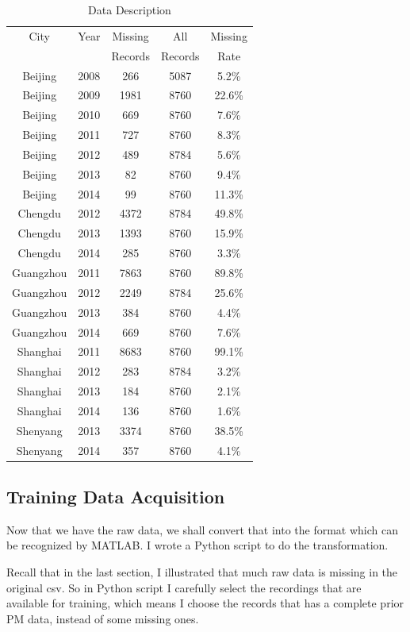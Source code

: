 \documentclass{sig-alternate}
\begin{document}
\begin{table}[ht]
\centering
\caption{Data Description}
\begin{tabular}{|c|c|c|c|c|}  \hline
City&Year&Missing&All&Missing \\
&&Records&Records&Rate\\ \hline
Beijing&2008&266&5087&5.2\% \\ \hline
Beijing&2009&1981&8760&22.6\% \\ \hline
Beijing&2010&669&8760&7.6\% \\ \hline
Beijing&2011&727&8760&8.3\% \\ \hline
Beijing&2012&489&8784&5.6\% \\ \hline
Beijing&2013&82&8760&9.4\% \\ \hline
Beijing&2014&99&8760&11.3\% \\ \hline \hline
Chengdu&2012&4372&8784&49.8\% \\ \hline
Chengdu&2013&1393&8760&15.9\% \\ \hline
Chengdu&2014&285&8760&3.3\% \\ \hline \hline
Guangzhou&2011&7863&8760&89.8\% \\ \hline
Guangzhou&2012&2249&8784&25.6\% \\ \hline
Guangzhou&2013&384&8760&4.4\% \\ \hline
Guangzhou&2014&669&8760&7.6\% \\ \hline \hline
Shanghai&2011&8683&8760&99.1\% \\ \hline
Shanghai&2012&283&8784&3.2\% \\ \hline
Shanghai&2013&184&8760&2.1\% \\ \hline
Shanghai&2014&136&8760&1.6\% \\ \hline \hline
Shenyang&2013&3374&8760&38.5\% \\ \hline
Shenyang&2014&357&8760&4.1\% \\ \hline \hline
\end{tabular}
\end{table}

\subsection{Training Data Acquisition}
Now that we have the raw data, we shall convert that into the format which can be recognized by MATLAB. I wrote a Python script to do the transformation.

Recall that in the last section, I illustrated that much raw data is missing in the original csv. So in Python script I carefully select the recordings that are available for training, which means I choose the records that has a complete prior PM data, instead of some missing ones.
\end{document}
